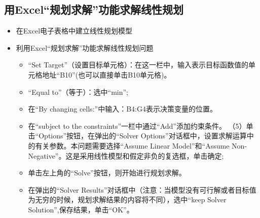 \subsection{用Excel“规划求解”功能求解线性规划}
\begin{frame}{\subsecname}
\begin{itemize}
    \item 在Excel电子表格中建立线性规划模型
    \item 利用Excel“规划求解”功能求解线性规划问题
    \begin{itemize}
        \item “Set Target”（设置目标单元格）：在这一栏中，输入表示目标函数值的单元格地址“B10”(也可以直接单击B10单元格)。
        \item “Equal to”（等于）：选中“min”;
        \item 在“By changing cells:”中输入：B4:G4表示决策变量的位置。
        \item 在“subject to the constraints”一栏中通过“Add”添加约束条件。
        （5）单击“Options”按钮，在弹出的“Solver Options”对话框中，设置求解运算中的有关参数。本问题需要选择“Assume Linear Model”和“Assume Non-Negative”。这是采用线性模型和假定非负的复选框，单击确定;
\item 单击左上角的“Solve”按钮，则开始进行规划求解。
\item 在弹出的“Solver Results”对话框中（注意：当模型没有可行解或者目标值为无穷的时候，规划求解结果的内容将不同），选中“keep Solver Solution”,保存结果，单击“OK”。
    \end{itemize}
\end{itemize}
\end{frame}

